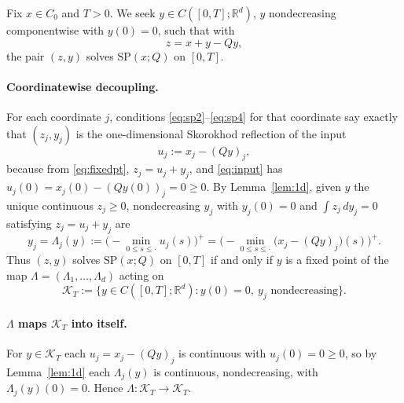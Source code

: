 \documentclass{amsart}
\theoremstyle{definition}
\theoremstyle{remark}
\newcommand{\R}{\mathbb{R}}
\begin{document}
Fix $x\in C_0$ and $T>0$. We seek $y\in C([0,T];\R^d)$, $y$ nondecreasing
componentwise with $y(0)=0$, such that with
\begin{equation}\label{eq:fixedpt}
  z=x+y-Qy,
\end{equation}
the pair $(z,y)$ solves $\mathrm{SP}(x;Q)$ on $[0,T]$.

\paragraph{Coordinatewise decoupling.}
For each coordinate $j$, conditions \eqref{eq:sp2}--\eqref{eq:sp4} for that
coordinate say exactly that $(z_j,y_j)$ is the one-dimensional Skorokhod
reflection of the input
\begin{equation}\label{eq:input}
  u_j:=x_j-(Qy)_j,
\end{equation}
because from \eqref{eq:fixedpt}, $z_j=u_j+y_j$, and \eqref{eq:input} has
$u_j(0)=x_j(0)-(Qy(0))_j=0\ge0$. By Lemma~\ref{lem:1d}, given $y$ the unique
continuous $z_j\ge0$, nondecreasing $y_j$ with $y_j(0)=0$ and
$\int z_j\,dy_j=0$ satisfying $z_j=u_j+y_j$ are
\begin{equation}\label{eq:Tdef}
  y_j=\Lambda_j(y):=\Big({-}\!\min_{0\le s\le\cdot}u_j(s)\Big)^+
  =\Big({-}\!\min_{0\le s\le\cdot}\big(x_j-(Qy)_j\big)(s)\Big)^+ .
\end{equation}
Thus $(z,y)$ solves $\mathrm{SP}(x;Q)$ on $[0,T]$ if and only if $y$ is a fixed
point of the map $\Lambda=(\Lambda_1,\dots,\Lambda_d)$ acting on
\[
  \mathcal K_T:=\{y\in C([0,T];\R^d):y(0)=0,\ y_j\text{ nondecreasing}\}.
\]

\paragraph{$\Lambda$ maps $\mathcal K_T$ into itself.}
For $y\in\mathcal K_T$ each $u_j=x_j-(Qy)_j$ is continuous with
$u_j(0)=0\ge0$, so by Lemma~\ref{lem:1d} each $\Lambda_j(y)$ is continuous,
nondecreasing, with $\Lambda_j(y)(0)=0$. Hence $\Lambda:\mathcal K_T\to\mathcal
K_T$.
\end{document}

